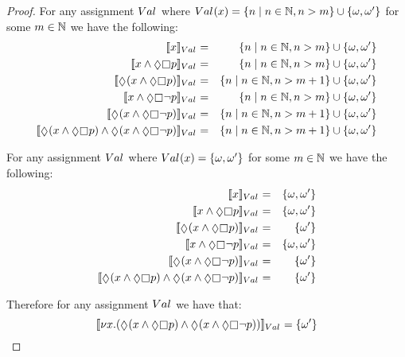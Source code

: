 \begin{proof}
For any assignment $\kAssignment$ where $\kAssignment(\varX) = \{n \mid n \in \naturals, n > m\} \cup \{\omega, \omega'\}$ for some $m \in \mathbb{N}$ we have the following:
\begin{eqnarray*}
    \interpretation[\kAssignment]{\varX} &=& \{n \mid n \in \naturals, n > m\} \cup \{\omega, \omega'\}\\
    \interpretation[\kAssignment]{\varX \land \possible \necessary \atomP} &=& \{n \mid n \in \naturals, n > m\} \cup \{\omega, \omega'\}\\
    \interpretation[\kAssignment]{\possible (\varX \land \possible \necessary \atomP)} &=& \{n \mid n \in \naturals, n > m + 1\} \cup \{\omega, \omega'\}\\
    \interpretation[\kAssignment]{\varX \land \possible \necessary \neg \atomP} &=& \{n \mid n \in \naturals, n > m\} \cup \{\omega, \omega'\}\\
    \interpretation[\kAssignment]{\possible (\varX \land \possible \necessary \neg \atomP)} &=& \{n \mid n \in \naturals, n > m + 1\} \cup \{\omega, \omega'\}\\
    \interpretation[\kAssignment]{\possible (\varX \land \possible \necessary \atomP) \land \possible (\varX \land \possible \necessary \neg \atomP)} &=& \{n \mid n \in \naturals, n > m + 1\} \cup \{\omega, \omega'\}
\end{eqnarray*}

For any assignment $\kAssignment$ where $\kAssignment(\varX) = \{\omega, \omega'\}$ for some $m \in \mathbb{N}$ we have the following:
\begin{eqnarray*}
    \interpretation[\kAssignment]{\varX} &=& \{\omega, \omega'\}\\
    \interpretation[\kAssignment]{\varX \land \possible \necessary \atomP} &=& \{\omega, \omega'\}\\
    \interpretation[\kAssignment]{\possible (\varX \land \possible \necessary \atomP)} &=& \{\omega'\}\\
    \interpretation[\kAssignment]{\varX \land \possible \necessary \neg \atomP} &=& \{\omega, \omega'\}\\
    \interpretation[\kAssignment]{\possible (\varX \land \possible \necessary \neg \atomP)} &=& \{\omega'\}\\
    \interpretation[\kAssignment]{\possible (\varX \land \possible \necessary \atomP) \land \possible (\varX \land \possible \necessary \neg \atomP)} &=& \{\omega'\}
\end{eqnarray*}

Therefore for any assignment $\kAssignment$ we have that: $$\interpretation[\kAssignment]{\gfp{\varX} (\possible (\varX \land \possible \necessary \atomP) \land \possible (\varX \land \possible \necessary \neg \atomP))} = \{\omega'\}$$


\end{proof}
